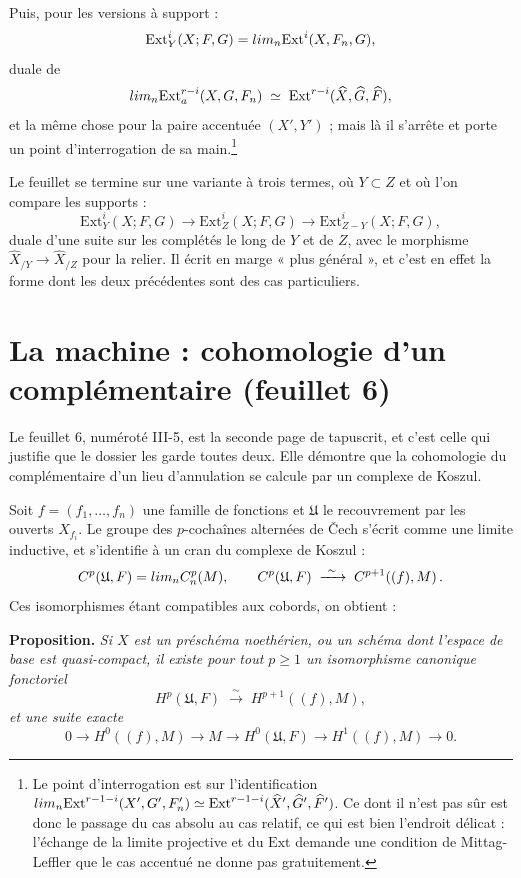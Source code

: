 \documentclass[11pt,a4paper]{article}
\begin{document}
Puis, pour les versions à support :
\[
  \mathrm{Ext}^{i}_{Y}(X; F, G) = \varinjlim_{n} \mathrm{Ext}^{i}(X, F_{n}, G),
\]
duale de
\[
  \varprojlim_{n} \mathrm{Ext}^{r-i}_{a}(X, G, F_{n}) \;\simeq\;
  \mathrm{Ext}^{r-i}(\widehat{X}, \widehat{G}, \widehat{F}),
\]
et la même chose pour la paire accentuée $(X', Y')$ ; mais là il s'arrête et
porte un point d'interrogation de sa main.\footnote{Le point d'interrogation
est sur l'identification $\varprojlim_{n} \mathrm{Ext}^{r-1-i}(X', G', F'_{n})
\simeq \mathrm{Ext}^{r-1-i}(\widehat{X}', \widehat{G}', \widehat{F}')$. Ce
dont il n'est pas sûr est donc le passage du cas absolu au cas relatif, ce qui
est bien l'endroit délicat : l'échange de la limite projective et du
$\mathrm{Ext}$ demande une condition de Mittag-Leffler que le cas accentué ne
donne pas gratuitement.}

Le feuillet se termine sur une variante à trois termes, où $Y \subset Z$ et où
l'on compare les supports :
\[
  \mathrm{Ext}^{i}_{Y}(X; F, G) \to \mathrm{Ext}^{i}_{Z}(X; F, G) \to
  \mathrm{Ext}^{i}_{Z-Y}(X; F, G),
\]
duale d'une suite sur les complétés le long de $Y$ et de $Z$, avec le morphisme
$\widehat{X}_{/Y} \to \widehat{X}_{/Z}$ pour la relier. Il écrit en marge
« plus général », et c'est en effet la forme dont les deux précédentes sont des
cas particuliers.

\section*{La machine : cohomologie d'un complémentaire (feuillet 6)}

Le feuillet 6, numéroté III-5, est la seconde page de tapuscrit, et c'est celle
qui justifie que le dossier les garde toutes deux. Elle démontre que la
cohomologie du complémentaire d'un lieu d'annulation se calcule par un complexe
de Koszul.

Soit $f = (f_{1}, \ldots, f_{n})$ une famille de fonctions et $\mathfrak{U}$ le
recouvrement par les ouverts $X_{f_{i}}$. Le groupe des $p$-cochaînes alternées
de Čech s'écrit comme une limite inductive, et s'identifie à un cran du
complexe de Koszul :
\[
  C^{p}(\mathfrak{U}, F) = \varinjlim_{n} C^{p}_{n}(M),
  \qquad
  C^{p}(\mathfrak{U}, F) \;\xrightarrow{\ \sim\ }\; C^{p+1}\!\left((f), M\right).
\]
Ces isomorphismes étant compatibles aux cobords, on obtient :

\textbf{Proposition.} \emph{Si $X$ est un préschéma noethérien, ou un
schéma dont l'espace de base est quasi-compact, il existe pour tout
$p \geqslant 1$ un isomorphisme canonique fonctoriel}
\[
  H^{p}(\mathfrak{U}, F) \;\xrightarrow{\ \sim\ }\; H^{p+1}\!\left((f), M\right),
\]
\emph{et une suite exacte}
\[
  0 \to H^{0}((f), M) \to M \to H^{0}(\mathfrak{U}, F) \to H^{1}((f), M) \to 0 .
\]
\end{document}
